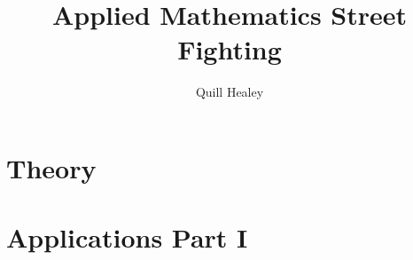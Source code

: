 \documentclass[12pt,reqno]{report}
\title{Applied Mathematics Street Fighting}
\author{Quill Healey}
\theoremstyle{definition}
\numberwithin{equation}{section}
\begin{document}
\maketitle
\tableofcontents

% 



\part{Theory}








\part{Applications Part I}










\end{document}
